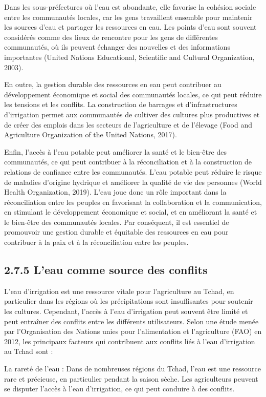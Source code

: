 \documentclass[12pt,oneside]{report}
\begin{document}
Dans les sous-préfectures où l'eau est abondante, elle favorise la cohésion sociale entre les communautés locales, car les gens travaillent ensemble pour maintenir les sources d'eau et partager les ressources en eau. Les points d'eau sont souvent considérés comme des lieux de rencontre pour les gens de différentes communautés, où ils peuvent échanger des nouvelles et des informations importantes (United Nations Educational, Scientific and Cultural Organization, 2003).

En outre, la gestion durable des ressources en eau peut contribuer au développement économique et social des communautés locales, ce qui peut réduire les tensions et les conflits. La construction de barrages et d'infrastructures d'irrigation permet aux communautés de cultiver des cultures plus productives et de créer des emplois dans les secteurs de l'agriculture et de l'élevage (Food and Agriculture Organization of the United Nations, 2017).

Enfin, l'accès à l'eau potable peut améliorer la santé et le bien-être des communautés, ce qui peut contribuer à la réconciliation et à la construction de relations de confiance entre les communautés. L'eau potable peut réduire le risque de maladies d'origine hydrique et améliorer la qualité de vie des personnes (World Health Organization, 2019). L'eau joue donc un rôle important dans la réconciliation entre les peuples en favorisant la collaboration et la communication, en stimulant le développement économique et social, et en améliorant la santé et le bien-être des communautés locales. Par conséquent, il est essentiel de promouvoir une gestion durable et équitable des ressources en eau pour contribuer à la paix et à la réconciliation entre les peuples.

\subsection{2.7.5 L’eau comme source des conflits}
L'eau d'irrigation est une ressource vitale pour l'agriculture au Tchad, en particulier dans les régions où les précipitations sont insuffisantes pour soutenir les cultures. Cependant, l'accès à l'eau d'irrigation peut souvent être limité et peut entraîner des conflits entre les différents utilisateurs. Selon une étude menée par l'Organisation des Nations unies pour l'alimentation et l'agriculture (FAO) en 2012, les principaux facteurs qui contribuent aux conflits liés à l'eau d'irrigation au Tchad sont :

La rareté de l'eau : Dans de nombreuses régions du Tchad, l'eau est une ressource rare et précieuse, en particulier pendant la saison sèche. Les agriculteurs peuvent se disputer l'accès à l'eau d'irrigation, ce qui peut conduire à des conflits.
\end{document}

